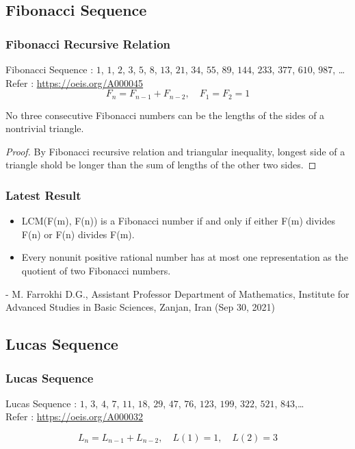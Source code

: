 \documentclass{beamer}
\begin{document}
\subsection{Fibonacci Sequence}
\begin{frame}
\frametitle{Fibonacci Recursive Relation}
	Fibonacci Sequence : $1$, $1$, $2$, $3$, $5$, $8$, $13$, $21$, $34$, $55$, $89$, $144$, $233$, $377$, $610$, $987$, \dots \\
	Refer : \url{https://oeis.org/A000045}
\begin{equation}
	F_n = F_{n-1} + F_{n-2},\quad F_1 = F_2 = 1 
\end{equation}

\begin{theorem}
	No three consecutive Fibonacci numbers can be the lengths of the sides of a nontrivial triangle.
\end{theorem}
\begin{proof}
	By Fibonacci recursive relation and triangular inequality, longest side of a triangle shold be longer than the sum of lengths of the other two sides.
\end{proof}
\end{frame}

\begin{frame}
\frametitle{Latest Result}
	\begin{itemize}
		\item LCM(F(m), F(n)) is a Fibonacci number if and only if either F(m) divides F(n) or F(n) divides F(m).
		\item Every nonunit positive rational number has at most one representation as the quotient of two Fibonacci numbers.
	\end{itemize}
	- M. Farrokhi D.G., Assistant Professor Department of Mathematics, Institute for Advanced Studies in Basic Sciences, Zanjan, Iran (Sep 30, 2021)
\end{frame}

\subsection{Lucas Sequence}
\begin{frame}
\frametitle{Lucas Sequence}
Lucas Sequence : $1$, $3$, $4$, $7$, $11$, $18$, $29$, $47$, $76$, $123$, $199$, $322$, $521$, $843$,\dots\\
	Refer : \url{https://oeis.org/A000032}

	\begin{equation}
		L_n = L_{n-1} + L_{n-2},\quad L(1) = 1,\quad L(2) = 3
	\end{equation}
\end{frame}
\end{document}
